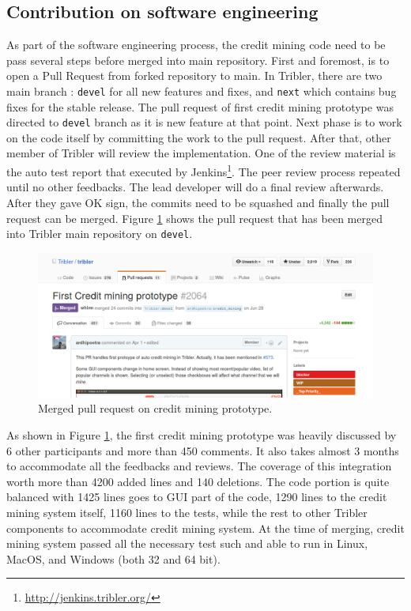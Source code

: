 \subsection{Contribution on software engineering}
As part of the software engineering process, the credit mining code need to be pass several steps before merged into main repository. First and foremost, is to open a Pull Request from forked repository to main. In Tribler, there are two main branch : \texttt{devel} for all new features and fixes, and \texttt{next} which contains bug fixes for the stable release. The pull request of first credit mining prototype was directed to \texttt{devel} branch as it is new feature at that point. Next phase is to work on the code itself by committing the work to the pull request. After that, other member of Tribler will review the implementation. One of the review material is the auto test report that executed by Jenkins\footnote{\url{http://jenkins.tribler.org/}}. The peer review process repeated until no other feedbacks. The lead developer will do a final review afterwards. After they gave OK sign, the commits need to be squashed and finally the pull request can be merged. Figure \ref{fig:cmpullrequest} shows the pull request that has been merged into Tribler main repository on \texttt{devel}.

\begin{figure}[h]
	\centering
	\includegraphics[width=\textwidth]{pics/cm_pr_crop.png}
	\caption[Merged pull request on credit mining prototype]{Merged pull request on credit mining prototype\footnotemark.}
	\label{fig:cmpullrequest}
\end{figure}

As shown in Figure \ref{fig:cmpullrequest}, the first credit mining prototype was heavily discussed by 6 other participants and more than 450 comments. It also takes almost 3 months to accommodate all the feedbacks and reviews. The coverage of this integration worth more than 4200 added lines and 140 deletions. The code portion is quite balanced with 1425 lines goes to GUI part of the code, 1290 lines to the credit mining system itself, 1160 lines to the tests, while the rest to other Tribler components to accommodate credit mining system. At the time of merging, credit mining system passed all the necessary test such and able to run in Linux, MacOS, and Windows (both 32 and 64 bit).

